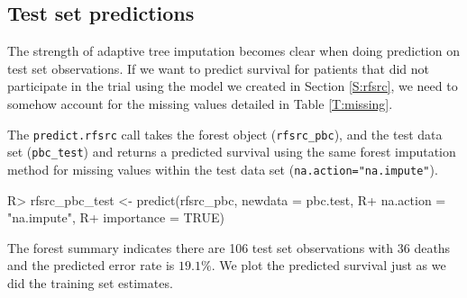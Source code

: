 \documentclass[article, nojss]{jss}
\begin{document}
\subsection{Test set predictions}\label{test-set-predictions}

The strength of adaptive tree imputation becomes clear when doing
prediction on test set observations. If we want to predict survival for
patients that did not participate in the trial using the model we
created in Section \ref{S:rfsrc}, we need to somehow account for the
missing values detailed in Table \ref{T:missing}.

The \texttt{predict.rfsrc} call takes the forest object
(\texttt{rfsrc\_pbc}), and the test data set (\texttt{pbc\_test}) and
returns a predicted survival using the same forest imputation method for
missing values within the test data set
(\texttt{na.action="na.impute"}).

\begin{Schunk}
\begin{Sinput}
R> rfsrc_pbc_test <- predict(rfsrc_pbc, newdata = pbc.test,
R+                           na.action = "na.impute",
R+                           importance = TRUE)
\end{Sinput}
\end{Schunk}

The forest summary indicates there are 106 test set observations with 36
deaths and the predicted error rate is \(19.1\%\). We plot the predicted
survival just as we did the training set estimates.
\end{document}
